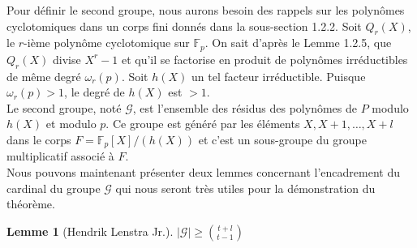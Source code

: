\documentclass[11pt]{article}
\newtheorem{lemm}{Lemme}[subsection]
\begin{document}
Pour définir le second groupe, nous aurons besoin des rappels sur les polynômes cyclotomiques dans un corps fini donnés dans la sous-section 1.2.2. Soit $Q_r(X)$, le $r$-ième polynôme cyclotomique sur $\mathbb{F}_p$. On sait d'après le Lemme 1.2.5, que $Q_r(X)$ divise $X^r-1$ et qu'il se factorise en produit de polynômes irréductibles de même degré $\omega_r(p)$. Soit $h(X)$ un tel facteur irréductible. Puisque $\omega_r(p)>1$, le degré de $h(X)$ est $>1$.\\

Le second groupe, noté $\mathcal{G}$, est l'ensemble des résidus des polynômes de $P$ modulo $h(X)$ et modulo $p$. Ce groupe est généré par les éléments $X, X+1, \dots, X+l$ dans le corps $F=\mathbb{F}_p[X]/(h(X))$ et c'est un sous-groupe du groupe multiplicatif associé à $F$.\\

Nous pouvons maintenant présenter deux lemmes concernant l'encadrement du cardinal du groupe $\mathcal{G}$ qui nous seront très utiles pour la démonstration du théorème.

\begin{lemm}[Hendrik Lenstra Jr.]
$\vert \mathcal{G} \vert \geqslant \binom{t+l}{t-1}$
\end{lemm}
\end{document}
